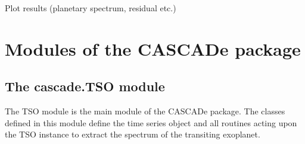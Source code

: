 \documentclass[a4paper,10pt,english]{sphinxmanual}
\begin{document}
Plot results (planetary spectrum, residual etc.)

%
\begin{sphinxVerbatim}[commandchars=\\\{\}]
\end{sphinxVerbatim}


\section{Modules of the CASCADe package}
\label{\detokenize{cascade:modules-of-the-cascade-package}}\label{\detokenize{cascade::doc}}

\subsection{The cascade.TSO module}
\label{\detokenize{cascade.TSO:module-cascade.TSO.TSO}}\label{\detokenize{cascade.TSO:the-cascade-tso-module}}\label{\detokenize{cascade.TSO::doc}}
The TSO module is the main module of the CASCADe package.
The classes defined in this module define the time series object and
all routines acting upon the TSO instance to extract the spectrum of the
transiting exoplanet.
\end{document}
